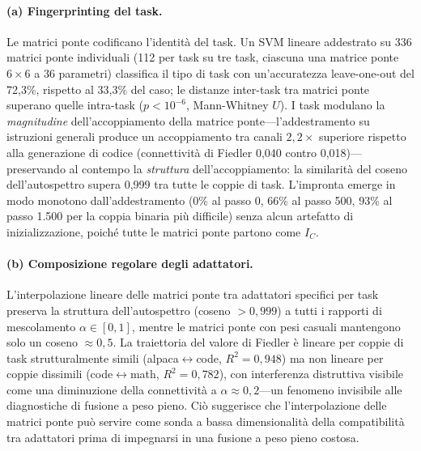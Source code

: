 \documentclass[11pt]{article}
\begin{document}
\paragraph{(a) Fingerprinting del task.}
Le matrici ponte codificano l'identit\`a del task.
Un SVM lineare addestrato su 336 matrici ponte individuali (112 per
task su tre task, ciascuna una matrice ponte $6 \times 6$ a 36
parametri) classifica il tipo di task con un'accuratezza leave-one-out
del 72,3\%, rispetto al 33,3\% del caso; le distanze inter-task tra
matrici ponte superano quelle intra-task ($p < 10^{-6}$,
Mann-Whitney $U$).
I task modulano la \emph{magnitudine} dell'accoppiamento della matrice
ponte---l'addestramento su istruzioni generali produce un accoppiamento
tra canali $2{,}2\times$ superiore rispetto alla generazione di codice
(connettivit\`a di Fiedler 0,040 contro 0,018)---preservando al contempo
la \emph{struttura} dell'accoppiamento: la similarit\`a del coseno
dell'autospettro supera 0,999 tra tutte le coppie di task.
L'impronta emerge in modo monotono dall'addestramento
(0\% al passo 0, 66\% al passo 500, 93\% al passo 1.500 per la coppia
binaria pi\`u difficile) senza alcun artefatto di inizializzazione,
poich\'e tutte le matrici ponte partono come $I_C$.

\paragraph{(b) Composizione regolare degli adattatori.}
L'interpolazione lineare delle matrici ponte tra adattatori specifici
per task preserva la struttura dell'autospettro (coseno $> 0{,}999$) a
tutti i rapporti di mescolamento $\alpha \in [0, 1]$, mentre le matrici
ponte con pesi casuali mantengono solo un coseno $\approx 0{,}5$.
La traiettoria del valore di Fiedler \`e lineare per coppie di task
strutturalmente simili (alpaca$\leftrightarrow$code, $R^2 = 0{,}948$)
ma non lineare per coppie dissimili (code$\leftrightarrow$math,
$R^2 = 0{,}782$), con interferenza distruttiva visibile come una
diminuzione della connettivit\`a a $\alpha \approx 0{,}2$---un fenomeno
invisibile alle diagnostiche di fusione a peso pieno.
Ci\`o suggerisce che l'interpolazione delle matrici ponte pu\`o servire
come sonda a bassa dimensionalit\`a della compatibilit\`a tra adattatori
prima di impegnarsi in una fusione a peso pieno costosa.
\end{document}
